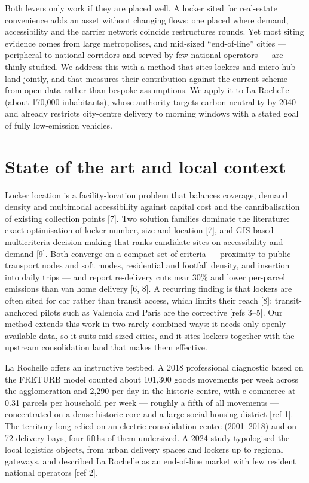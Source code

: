 \documentclass[3p,times]{elsarticle}
\begin{document}
Both levers only work if they are placed well. A locker sited for real-estate
convenience adds an asset without changing flows; one placed where demand,
accessibility and the carrier network coincide restructures rounds. Yet most
siting evidence comes from large metropolises, and mid-sized ``end-of-line''
cities --- peripheral to national corridors and served by few national operators
--- are thinly studied. We address this with a method that sites lockers and
micro-hub land jointly, and that measures their contribution against the current
scheme from open data rather than bespoke assumptions. We apply it to La Rochelle
(about 170,000 inhabitants), whose authority targets carbon neutrality by 2040 and
already restricts city-centre delivery to morning windows with a stated goal of
fully low-emission vehicles.

\section{State of the art and local context}
Locker location is a facility-location problem that balances coverage, demand
density and multimodal accessibility against capital cost and the cannibalisation
of existing collection points [7]. Two solution families dominate the literature:
exact optimisation of locker number, size and location [7], and GIS-based
multicriteria decision-making that ranks candidate sites on accessibility and
demand [9]. Both converge on a compact set of criteria --- proximity to
public-transport nodes and soft modes, residential and footfall density, and
insertion into daily trips --- and report re-delivery cuts near 30\% and lower
per-parcel emissions than van home delivery [6, 8]. A recurring finding is that
lockers are often sited for car rather than transit access, which limits their
reach [8]; transit-anchored pilots such as Valencia and Paris are the corrective
[refs 3--5]. Our method extends this work in two rarely-combined ways: it needs
only openly available data, so it suits mid-sized cities, and it sites lockers
together with the upstream consolidation land that makes them effective.

La Rochelle offers an instructive testbed. A 2018 professional diagnostic based on
the FRETURB model counted about 101,300 goods movements per week across the
agglomeration and 2,290 per day in the historic centre, with e-commerce at 0.31
parcels per household per week --- roughly a fifth of all movements --- concentrated
on a dense historic core and a large social-housing district [ref 1]. The territory
long relied on an electric consolidation centre (2001--2018) and on 72 delivery
bays, four fifths of them undersized. A 2024 study typologised the local logistics
objects, from urban delivery spaces and lockers up to regional gateways, and
described La Rochelle as an end-of-line market with few resident national operators
[ref 2].
\end{document}
